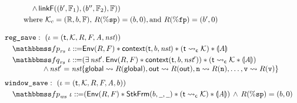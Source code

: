 \begin{figure}[!thp]
\[\begin{array}{l}
\begin{array}{lcl}
                    & & \quad
                    \, \land \, 
                    \linkF((\block', \hWstk_1), (\block'', \hWstk_2), \hWstk)
                ) \\
                \\[-9pt]
                \multicolumn{3}{l}
                {
                    \qquad 
                    \text{where} \ 
                    \hthrdlocalst_c = (\hRfile, \block, \hWstk), \, 
                    \RFile(\spreg) = (\block, 0), \text{and } 
                    \RFile(\fpreg) = (\block', 0)
                }
            \end{array} 
            \\
            \\
            \texttt{reg\_save}: \ (\lgvl = (\thrdid, \hthrdlocalst, \RFile, \Wstack, 
            \primcom, \nst)) \\
            \\[-9pt]
            \quad 
            \relspecpre_{\textit{rs}} \ \lgvl \define 
            \Env{\RFile, \Wstack} \sepstar 
            \context{\thrdid, \block, \nst} \sepstar 
            (\astCurCont{\thrdid}{\hthrdlocalst}) \sepstar \safePrimAst{\primcom} \\
            \\[-9pt]
            \quad
            \relspecpost_{\textit{rs}} \ \lgvl \define 
            (\exists \, \nst'. \, \Env{\RFile, \Wstack} \sepstar
            \relcontext{\thrdid}{\block}{\nst'}) \sepstar 
            (\astCurCont{\thrdid}{\hthrdlocalst} \sepstar \safePrimAst{\primcom}) \\
            \hspace*{5em}
            \, \land \, 
            \nst' = \nst\{ \globalRN \rightsquigarrow \RFile(\globalRN), 
                \outRN \rightsquigarrow \RFile(\outRN), 
                \regn \rightsquigarrow \RFile(\regn), \dots, 
                \regv \rightsquigarrow \RFile(\regv) \}  \\
            \\[-5pt]
            \texttt{window\_save}: \ (\lgvl = (\thrdid, \hthrdlocalst, \RFile, 
                \Wstack, \primcom, \block)) \\
            \\[-9pt]
            \quad
            \relspecpre_{\textit{ws}} \ \lgvl \define 
            (\Env{\RFile, \Wstack} \sepstar \RelStkFm{\block}{\notCare}{\notCare}
            \sepstar (\astCurCont{\thrdid}{\hthrdlocalst}) \sepstar 
            \safePrimAst{\primcom}) \, \land \, \RFile(\spreg) = (\block, 0) \\

\end{array}\]
\end{figure}

